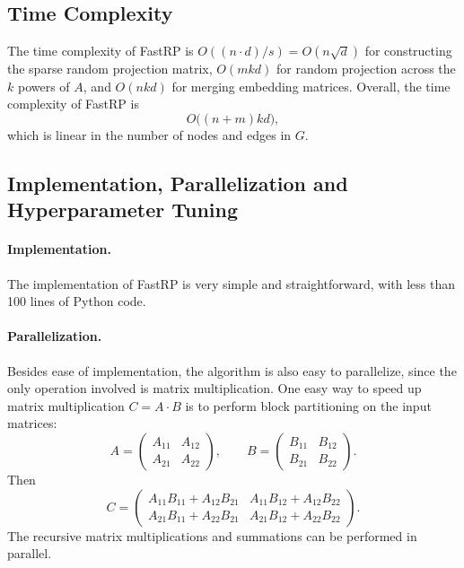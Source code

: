 \documentclass[11pt]{article}
\begin{document}
\subsection{Time Complexity}

The time complexity of FastRP is $O((n\cdot d)/s)=O(n\sqrt{d})$ for constructing the sparse random projection matrix, $O(mkd)$ for random projection across the $k$ powers of $A$, and $O(nkd)$ for merging embedding matrices. Overall, the time complexity of FastRP is
\[
O\bigl((n+m)kd\bigr),
\]
which is linear in the number of nodes and edges in $G$.

\subsection{Implementation, Parallelization and Hyperparameter Tuning}

\paragraph{Implementation.}
The implementation of FastRP is very simple and straightforward, with less than 100 lines of Python code.

\paragraph{Parallelization.}
Besides ease of implementation, the algorithm is also easy to parallelize, since the only operation involved is matrix multiplication. One easy way to speed up matrix multiplication $C=A\cdot B$ is to perform block partitioning on the input matrices:
\begin{equation}
A = \begin{pmatrix} A_{11} & A_{12} \\ A_{21} & A_{22} \end{pmatrix}, \qquad
B = \begin{pmatrix} B_{11} & B_{12} \\ B_{21} & B_{22} \end{pmatrix}.
\end{equation}
Then
\begin{equation}
C = \begin{pmatrix}
A_{11}B_{11}+A_{12}B_{21} & A_{11}B_{12}+A_{12}B_{22} \\
A_{21}B_{11}+A_{22}B_{21} & A_{21}B_{12}+A_{22}B_{22}
\end{pmatrix}.
\end{equation}
The recursive matrix multiplications and summations can be performed in parallel.
\end{document}

